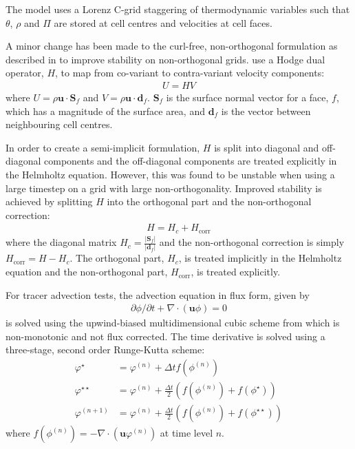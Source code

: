 \documentclass[twocol]{ametsoc}
\begin{document}
The model uses a Lorenz C-grid staggering of thermodynamic variables such that $\theta$, $\rho$ and $\Pi$ are stored at cell centres and velocities at cell faces.

A minor change has been made to the curl-free, non-orthogonal formulation as described in \citet{weller-shahrokhi2014} to improve stability on non-orthogonal grids.  \citet{weller-shahrokhi2014} use a Hodge dual operator, \(H\), to map from co-variant to contra-variant velocity components:
\begin{align}
	U = HV
\end{align}
where \(U = \rho\bm{u}\cdot\bm{S}_f\) and \(V=\rho\bm{u}\cdot\bm{d}_f\).  \(\bm{S}_f\) is the surface normal vector for a face, \(f\), which has a magnitude of the surface area, and \(\bm{d}_f\) is the vector between neighbouring cell centres.

In order to create a semi-implicit formulation, \(H\) is split into diagonal and off-diagonal components and the off-diagonal components are treated explicitly in the Helmholtz equation.  However, this was found to be unstable when using a large timestep on a grid with large non-orthogonality.  Improved stability is achieved by splitting \(H\) into the orthogonal part and the non-orthogonal correction: 
\begin{align}
	H = H_c + H_\mathrm{corr}
\end{align}
where the diagonal matrix \(H_c=\frac{|\bm{S}_f|}{|\bm{d}_f|}\) and the non-orthogonal correction is simply \(H_\mathrm{corr} = H - H_c\).  The orthogonal part, \(H_c\), is treated implicitly in the Helmholtz equation and the non-orthogonal part, \(H_\mathrm{corr}\), is treated explicitly. 

For tracer advection tests, the advection equation in flux form, given by
\begin{align}
\partial \phi / \partial t + \nabla \cdot \left( \bm{u} \phi \right) = 0
\end{align}
is solved using the upwind-biased multidimensional cubic scheme from \citet{weller-shahrokhi2014} which is non-monotonic and not flux corrected.
The time derivative is solved using a three-stage, second order Runge-Kutta scheme:
\begin{subequations}
\begin{align}
	\varphi^\star &= \varphi^{(n)} + \Delta t f(\phi^{(n)}) \\
	\varphi^{\star\star} &= \varphi^{(n)} + \frac{\Delta t}{2} \left( f(\phi^{(n)}) + f(\phi^\star) \right) \\
	\varphi^{(n+1)} &= \varphi^{(n)} + \frac{\Delta t}{2} \left( f(\phi^{(n)}) + f(\phi^{\star\star}) \right)
\end{align}
\end{subequations}
where \(f(\phi^{(n)}) = - \nabla \cdot (\bm{u} \varphi^{(n)})\) at time level \(n\).
\end{document}
